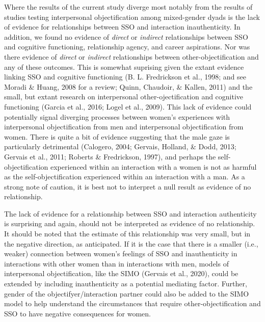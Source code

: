 \documentclass[man]{apa6}
\begin{document}
Where the results of the current study diverge most notably from the
results of studies testing interpersonal objectification among
mixed-gender dyads is the lack of evidence for relationships between SSO
and interaction inauthenticity. In addition, we found no evidence of
\emph{direct} or \emph{indirect} relationships between SSO and cognitive
functioning, relationship agency, and career aspirations. Nor was there
evidence of \emph{direct} or \emph{indirect} relationships between
other-objectification and any of these outcomes. This is somewhat
suprising given the extant evidence linking SSO and cognitive
functioning (B. L. Fredrickson et al., 1998; and see Moradi \& Huang,
2008 for a review; Quinn, Chaudoir, \& Kallen, 2011) and the small, but
extant research on interpersonal other-ojectification and cognitive
functioning (Garcia et al., 2016; Logel et al., 2009). This lack of
evidence could potentially signal diverging processes between women's
experiences with interpersonal objectification from men and
interpersonal objectification from women. There is quite a bit of
evidence suggesting that the male gaze is particularly detrimental
(Calogero, 2004; Gervais, Holland, \& Dodd, 2013; Gervais et al., 2011;
Roberts \& Fredrickson, 1997), and perhaps the self-objectification
experienced within an interaction with a women is not as harmful as the
self-objectification experienced within an interaction with a man. As a
strong note of caution, it is best not to interpret a null result as
evidence of no relationship.

The lack of evidence for a relationship between SSO and interaction
authenticity is surprising and again, should not be interpreted as
evidence of no relationship. It should be noted that the estimate of
this relationship was very small, but in the negative direction, as
anticipated. If it is the case that there is a smaller (i.e., weaker)
connection between women's feelings of SSO and inauthenticity in
interactions with other women than in interactions with men, models of
interpersonal objectification, like the SIMO (Gervais et al., 2020),
could be extended by including inauthenticity as a potential mediating
factor. Further, gender of the objectifyer/interaction partner could
also be added to the SIMO model to help understand the circumstances
that require other-objectification and SSO to have negative consequences
for women.
\end{document}
